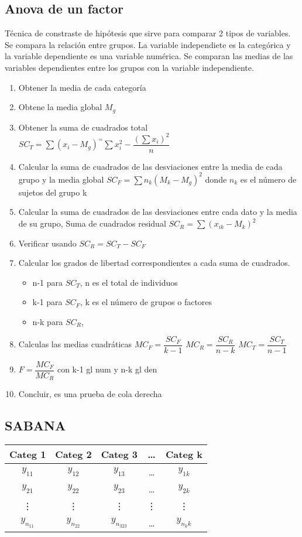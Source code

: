\subsection{Anova de un factor}
Técnica de constraste de hipótesis que sirve para comparar 2 tipos de variables. Se compara la relación entre grupos. La variable independiete es la categórica y la variable dependiente es una variable numérica. Se comparan las medias de las variables dependientes entre los grupos con la variable independiente.
\begin{enumerate}
	\item Obtener la media de cada categoría
	\item Obtene la media global $M_g$
	\item Obtener la suma de cuadrados total $SC_T=\sum(x_i-M_g)^=\sum x_i^2-\dfrac{(\sum x_i)^2}{n}$
	\item Calcular la suma de cuadrados de las desviaciones entre la media de cada grupo y la media global $SC_F=\sum n_k(M_k-M_g)^2$ donde $n_k$ es el número de sujetos del grupo k
	\item Calcular la suma de cuadrados de las desviaciones entre cada dato y la media de su grupo, Suma de cuadrados residual $SC_R=\sum(x_{ik}-M_k)^2$
	\item Verificar usando $SC_R=SC_T-SC_F$
	\item Calcular los grados de libertad correspondientes a cada suma de cuadrados.
	\begin{itemize}
		\item n-1 para $SC_T$, n es el total de individuos
		\item k-1 para $SC_F$, k es el número de grupos o factores
		\item n-k para $SC_R$, 
	\end{itemize}
	\item Calculas las medias cuadráticas $MC_F=\dfrac{SC_F}{k-1}$ $MC_R=\dfrac{SC_R}{n-k}$ $MC_T=\dfrac{SC_T}{n-1}$
	\item $F=\dfrac{MC_F}{MC_R}$ con k-1 gl num y n-k gl den
	\item Concluir, es una prueba de cola derecha
\end{enumerate}
\subsection{SABANA}

\begin{tabular}{ccccc}
	\hline
	Categ 1 & Categ 2 & Categ 3 & \dots & Categ k\\
	\hline
	$y_{11}$ & $y_{12}$ & $y_{13}$ & \dots & $y_{1k}$\\
	$y_{21}$ & $y_{22}$ & $y_{23}$ & \dots & $y_{2k}$\\
	\vdots   & \vdots   & \vdots   & \vdots& \vdots\\
	$y_{n_11}$ & $y_{n_22}$ & $y_{n_323}$ & \dots & $y_{n_kk}$
\end{tabular}\\

